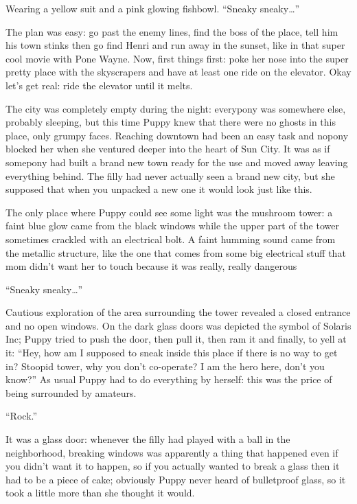 Wearing a yellow suit and a pink glowing fishbowl. ``Sneaky sneaky\dots''

The plan was easy: go past the enemy lines, find the boss of the place, tell him his town stinks then go find Henri and run away in the sunset, like in that super cool movie with Pone Wayne. Now, first things first: poke her nose into the super pretty place with the skyscrapers and have at least one ride on the elevator. Okay let's get real: ride the elevator until it melts.

The city was completely empty during the night: everypony was somewhere else, probably sleeping, but this time Puppy knew that there were no ghosts in this place, only grumpy faces. Reaching downtown had been an easy task and nopony blocked her when she ventured deeper into the heart of Sun City. It was as if somepony had built a brand new town ready for the use and moved away leaving everything behind. The filly had never actually seen a brand new city, but she supposed that when you unpacked a new one it would look just like this.

The only place where Puppy could see some light was the mushroom tower: a faint blue glow came from the black windows while the upper part of the tower sometimes crackled with an electrical bolt. A faint humming sound came from the metallic structure, like the one that comes from some big electrical stuff that mom didn't want her to touch because it was really, really dangerous 

``Sneaky sneaky\dots''

Cautious exploration of the area surrounding the tower revealed a closed entrance and no open windows. On the dark glass doors was depicted the symbol of Solaris Inc; Puppy tried to push the door, then pull it, then ram it and finally, to yell at it: ``Hey, how am I supposed to sneak inside this place if there is no way to get in? Stoopid tower, why you don't co-operate? I am the hero here, don't you know?'' As usual Puppy had to do everything by herself: this was the price of being surrounded by amateurs.

``Rock.''

It was a glass door: whenever the filly had played with a ball in the neighborhood, breaking windows was apparently a thing that happened even if you didn't want it to happen, so if you actually wanted to break a glass then it had to be a piece of cake; obviously Puppy never heard of bulletproof glass, so it took a little more than she thought it would.


